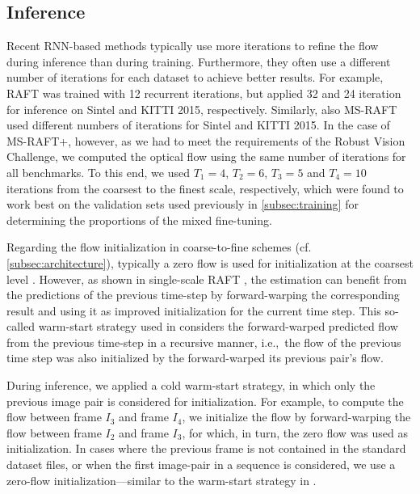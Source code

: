 \documentclass[conference,compsoc,a4paper]{IEEEtran}[2015/08/26]
\newcommand{\skipping}[1]{}
\begin{document}
\subsection{Inference}
\label{subsec:inference}
Recent RNN-based methods typically use more iterations to refine the flow during inference than during training.
Furthermore, they often use a different number of iterations for each dataset to achieve better results.
For example, RAFT \cite{Teed2020_RAFT} was trained with 12 recurrent iterations, but applied 32 and 24 iteration for inference on Sintel and KITTI 2015, respectively. Similarly, also MS-RAFT used different numbers of iterations for Sintel and KITTI 2015.
In the case of MS-RAFT+, however, as we had to meet the requirements of the Robust Vision Challenge, we computed the optical flow using the same number of iterations for all benchmarks. To this end, we used $T_1=4$, $T_2=6$, $T_3=5$ and $T_4=10$ iterations from the coarsest to the finest scale, respectively, which were found to work best on the validation sets used previously in \cref{subsec:training} for determining the proportions of the mixed fine-tuning.

Regarding the flow initialization in coarse-to-fine schemes (cf. \cref{subsec:architecture}), typically a zero flow is used for initialization  at the coarsest level \cite{Sun2018_PWC}. However, as shown in single-scale RAFT \cite{Teed2020_RAFT}, the estimation can benefit from the predictions of the previous time-step by forward-warping the corresponding result and using it as improved initialization for the current time step. This so-called warm-start strategy used in \cite{Teed2020_RAFT} considers the forward-warped predicted flow from the previous time-step in a recursive manner, i.e.,\ the flow of the previous time step was also initialized by the forward-warped its previous pair's flow. 

During inference, we applied a cold warm-start strategy, in which only the previous image pair is considered for initialization. For example, to compute the flow between frame $I_3$ and frame $I_4$, we initialize the flow by forward-warping the flow between frame $I_2$ and frame $I_3$, for which, in turn, the zero flow was used as initialization.
In cases where the previous frame is not contained in the standard dataset files, or when the first image-pair in a sequence is considered, we use a zero-flow initialization---similar to the warm-start strategy in \cite{Teed2020_RAFT}.
\skipping{
\cref{tbl:coldwarm} shows the results of cold (always zero initialization) and cold warm initialization strategies for MS-RAFT+ on Sintel (Test) and Middlebury (Test) benchmarks. Note that among the target benchmarks, only these mentioned datasets provided the samples in sequences in the standard dataset files. Clearly, for the other datasets, as there was no previous samples available, zero initialization was used.
}
\end{document}
